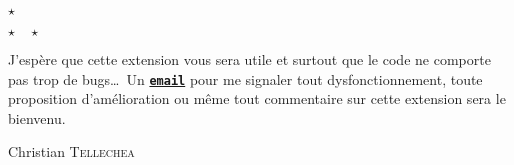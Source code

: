 \documentclass[10pt,french]{article}
\begin{document}
\begin{center}
\parskip0pt
$\star$\par
$\star\quad\star$
\end{center}
J'espère que cette extension vous sera utile et surtout que le code ne comporte pas trop de bugs\ldots\ Un \href{mailto:unbonpetit@netc.fr}{\texttt{\textbf{email}}} pour me signaler tout dysfonctionnement, toute proposition d'amélioration ou même tout commentaire sur cette extension sera le bienvenu.\par\medskip\nobreak
Christian \textsc{Tellechea}
\end{document}
